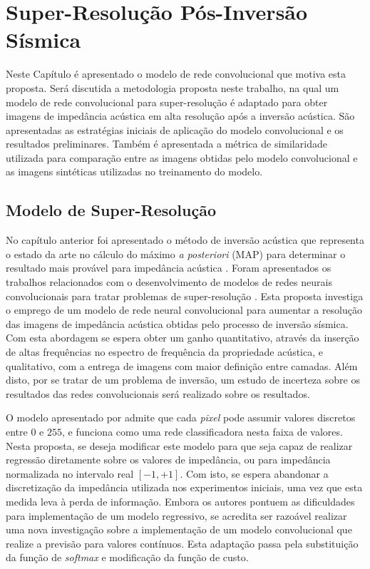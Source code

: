 \chapter{Super-Resolução Pós-Inversão Sísmica}
\label{cap:3modeloHibrido}

Neste Capítulo é apresentado o modelo de rede convolucional que motiva esta proposta. Será discutida
a metodologia proposta neste trabalho, na qual um modelo de rede convolucional para super-resolução é adaptado
para obter imagens de impedância acústica em alta resolução após a inversão acústica.
São apresentadas as estratégias iniciais de aplicação do modelo convolucional e
os resultados preliminares. Também é apresentada a métrica de similaridade utilizada
para comparação entre as imagens obtidas pelo modelo convolucional e as imagens sintéticas utilizadas no
treinamento do modelo.

\section{Modelo de Super-Resolução}

No capítulo anterior foi apresentado o método de inversão acústica que
representa o estado da arte no cálculo do máximo \textit{a posteriori} (MAP) para determinar o
resultado mais provável para impedância acústica \citep{Buland01012003, leandroGRSL}.
Foram apresentados os trabalhos relacionados com o desenvolvimento de modelos de redes neurais
convolucionais para tratar problemas de
super-resolução \citep{Oord16,He2016,DahlNS17}. Esta proposta investiga o emprego de um modelo de rede neural convolucional
para aumentar a resolução das imagens de impedância acústica
obtidas pelo processo de inversão sísmica. Com esta abordagem se espera obter um ganho
quantitativo, através da inserção de altas frequências no espectro de frequência da
propriedade acústica, e qualitativo, com a entrega de imagens com maior definição entre camadas.
Além disto, por se tratar de um problema de inversão, um estudo de incerteza sobre os
resultados das redes convolucionais será realizado sobre os resultados.

O modelo apresentado por \cite{DahlNS17} admite que cada \textit{pixel} pode assumir valores discretos entre
$0$ e $255$, e funciona como uma rede classificadora nesta faixa de valores. Nesta proposta,
se deseja modificar este modelo para que seja capaz de realizar regressão
diretamente sobre os valores de impedância, ou para impedância normalizada no intervalo real
$[-1,+1]$. Com isto, se espera abandonar a discretização da impedância utilizada
nos experimentos iniciais, uma vez que esta medida leva à perda de informação. 
Embora os autores pontuem as dificuldades para implementação de um modelo regressivo,
se acredita ser razoável realizar uma nova investigação sobre a implementação de um
modelo convolucional que realize a previsão para valores contínuos. Esta adaptação
passa pela substituição da função de \textit{softmax} e modificação da função de custo.

